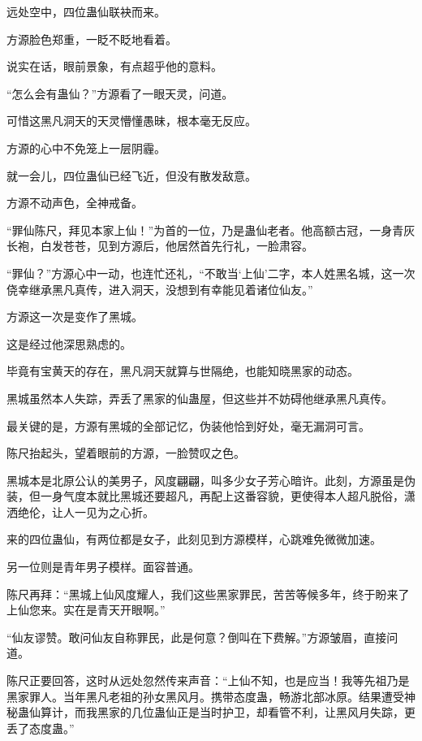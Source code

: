 
\begin{this_body}

远处空中，四位蛊仙联袂而来。

方源脸色郑重，一眨不眨地看着。

说实在话，眼前景象，有点超乎他的意料。

“怎么会有蛊仙？”方源看了一眼天灵，问道。

可惜这黑凡洞天的天灵懵懂愚昧，根本毫无反应。

方源的心中不免笼上一层阴霾。

就一会儿，四位蛊仙已经飞近，但没有散发敌意。

方源不动声色，全神戒备。

“罪仙陈尺，拜见本家上仙！”为首的一位，乃是蛊仙老者。他高额古冠，一身青灰长袍，白发苍苍，见到方源后，他居然首先行礼，一脸肃容。

“罪仙？”方源心中一动，也连忙还礼，“不敢当‘上仙’二字，本人姓黑名城，这一次侥幸继承黑凡真传，进入洞天，没想到有幸能见着诸位仙友。”

方源这一次是变作了黑城。

这是经过他深思熟虑的。

毕竟有宝黄天的存在，黑凡洞天就算与世隔绝，也能知晓黑家的动态。

黑城虽然本人失踪，弄丢了黑家的仙蛊屋，但这些并不妨碍他继承黑凡真传。

最关键的是，方源有黑城的全部记忆，伪装他恰到好处，毫无漏洞可言。

陈尺抬起头，望着眼前的方源，一脸赞叹之色。

黑城本是北原公认的美男子，风度翩翩，叫多少女子芳心暗许。此刻，方源虽是伪装，但一身气度本就比黑城还要超凡，再配上这番容貌，更使得本人超凡脱俗，潇洒绝伦，让人一见为之心折。

来的四位蛊仙，有两位都是女子，此刻见到方源模样，心跳难免微微加速。

另一位则是青年男子模样。面容普通。

陈尺再拜：“黑城上仙风度耀人，我们这些黑家罪民，苦苦等候多年，终于盼来了上仙您来。实在是青天开眼啊。”

“仙友谬赞。敢问仙友自称罪民，此是何意？倒叫在下费解。”方源皱眉，直接问道。

陈尺正要回答，这时从远处忽然传来声音：“上仙不知，也是应当！我等先祖乃是黑家罪人。当年黑凡老祖的孙女黑风月。携带态度蛊，畅游北部冰原。结果遭受神秘蛊仙算计，而我黑家的几位蛊仙正是当时护卫，却看管不利，让黑风月失踪，更丢了态度蛊。”


\end{this_body}
